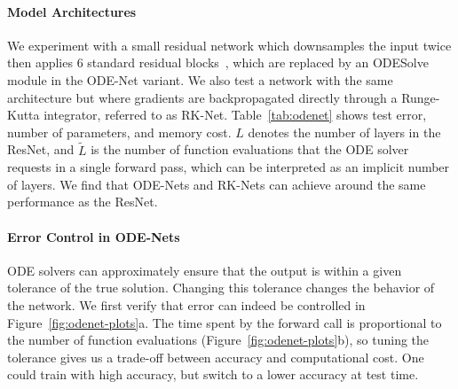 \documentclass{article}
\begin{document}
\paragraph{Model Architectures}
\begin{table}
	\vspace{-6mm}
	\caption{Performance on MNIST. $^\dagger$From \citet{lecun1998gradient}.}
	\label{tab:odenet}
	\centering
\end{table}
We experiment with a small residual network which downsamples the input twice then applies 6 standard residual blocks~\cite{he2016identity}, which are replaced by an ODESolve module in the ODE-Net variant.
We also test a network with the same architecture but where gradients are backpropagated directly through a Runge-Kutta integrator, referred to as RK-Net.
Table~\ref{tab:odenet} shows test error, number of parameters, and memory cost. $L$ denotes the number of layers in the ResNet, and $\tilde{L}$ is the number of function evaluations that the ODE solver requests in a single forward pass, which can be interpreted as an implicit number of layers.
We find that ODE-Nets and RK-Nets can achieve around the same performance as the ResNet.

\paragraph{Error Control in ODE-Nets}
ODE solvers can approximately ensure that the output is within a given tolerance of the true solution.
Changing this tolerance changes the behavior of the network.
We first verify that error can indeed be controlled in Figure~\ref{fig:odenet-plots}a.
The time spent by the forward call is proportional to the number of function evaluations (Figure~\ref{fig:odenet-plots}b), so tuning the tolerance gives us a trade-off between accuracy and computational cost.
One could train with high accuracy, but switch to a lower accuracy at test time.
\end{document}
